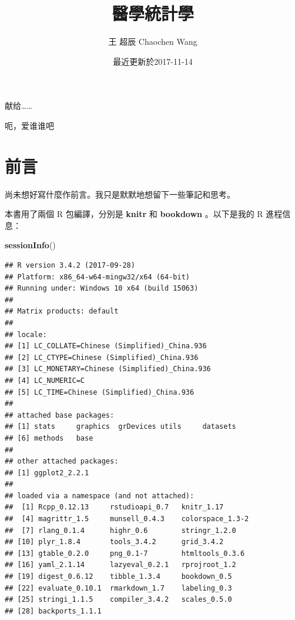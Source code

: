 \documentclass[]{ctexbook}
\title{醫學統計學}
\author{王 超辰 Chaochen Wang}
\date{最近更新於2017-11-14}
\newenvironment{Shaded}{\begin{snugshade}}{\end{snugshade}}
\newcommand{\KeywordTok}[1]{\textcolor[rgb]{0.13,0.29,0.53}{\textbf{#1}}}
\newcommand{\NormalTok}[1]{#1}
\begin{document}
\maketitle


\thispagestyle{empty}

\begin{center}
献给……

呃，爱谁谁吧
\end{center}

\setlength{\abovedisplayskip}{-5pt}
\setlength{\abovedisplayshortskip}{-5pt}

{
\setcounter{tocdepth}{2}
\tableofcontents
}
\listoftables
\listoffigures
\chapter*{前言}


尚未想好寫什麼作前言。我只是默默地想留下一些筆記和思考。

本書用了兩個 R 包編譯，分別是 \textbf{knitr}
\citep{xie2015} 和 \textbf{bookdown}
\citep{R-bookdown}。以下是我的 R 進程信息：

\begin{Shaded}
\begin{Highlighting}[]
\KeywordTok{sessionInfo}\NormalTok{()}
\end{Highlighting}
\end{Shaded}

\begin{verbatim}
## R version 3.4.2 (2017-09-28)
## Platform: x86_64-w64-mingw32/x64 (64-bit)
## Running under: Windows 10 x64 (build 15063)
## 
## Matrix products: default
## 
## locale:
## [1] LC_COLLATE=Chinese (Simplified)_China.936 
## [2] LC_CTYPE=Chinese (Simplified)_China.936   
## [3] LC_MONETARY=Chinese (Simplified)_China.936
## [4] LC_NUMERIC=C                              
## [5] LC_TIME=Chinese (Simplified)_China.936    
## 
## attached base packages:
## [1] stats     graphics  grDevices utils     datasets 
## [6] methods   base     
## 
## other attached packages:
## [1] ggplot2_2.2.1
## 
## loaded via a namespace (and not attached):
##  [1] Rcpp_0.12.13     rstudioapi_0.7   knitr_1.17      
##  [4] magrittr_1.5     munsell_0.4.3    colorspace_1.3-2
##  [7] rlang_0.1.4      highr_0.6        stringr_1.2.0   
## [10] plyr_1.8.4       tools_3.4.2      grid_3.4.2      
## [13] gtable_0.2.0     png_0.1-7        htmltools_0.3.6 
## [16] yaml_2.1.14      lazyeval_0.2.1   rprojroot_1.2   
## [19] digest_0.6.12    tibble_1.3.4     bookdown_0.5    
## [22] evaluate_0.10.1  rmarkdown_1.7    labeling_0.3    
## [25] stringi_1.1.5    compiler_3.4.2   scales_0.5.0    
## [28] backports_1.1.1
\end{verbatim}
\end{document}
